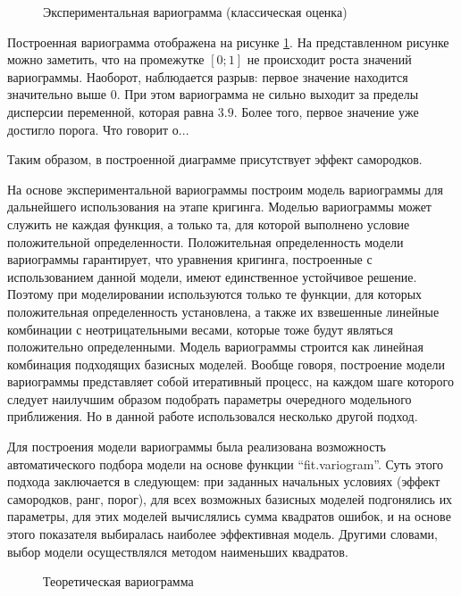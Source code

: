 \begin{figure}[ht]
\caption{Экспериментальная вариограмма (классическая оценка)}
\label{img:variog1_emp}
\end{figure}

Построенная вариограмма отображена на рисунке \ref{img:variog1_emp}. На представленном рисунке можно заметить, что на промежутке $[0;1]$ не происходит роста значений вариограммы. Наоборот, наблюдается разрыв: первое значение находится значительно выше $0$. При этом вариограмма не сильно выходит за пределы дисперсии переменной, которая равна $3.9$. Более того, первое значение уже достигло порога. Что говорит о...

Таким образом, в построенной диаграмме присутствует эффект самородков.

На основе экспериментальной вариограммы построим модель вариограммы для дальнейшего использования на этапе кригинга. Моделью вариограммы может служить не каждая функция, а только та, для которой выполнено условие положительной определенности. Положительная определенность модели вариограммы гарантирует, что уравнения кригинга, построенные с использованием данной модели, имеют единственное устойчивое решение. Поэтому при моделировании используются только те функции, для которых положительная определенность установлена, а также их взвешенные линейные комбинации с неотрицательными весами, которые тоже будут являться положительно определенными. Модель вариограммы строится как линейная комбинация подходящих базисных моделей. Вообще говоря, построение модели вариограммы представляет собой итеративный процесс, на каждом шаге которого следует наилучшим образом подобрать параметры очередного модельного приближения. Но в данной работе использовался несколько другой подход.

Для построения модели вариограммы была реализована возможность автоматического подбора модели на основе функции ``fit.variogram''. Суть этого подхода заключается в следующем: при заданных начальных условиях (эффект самородков, ранг, порог), для всех возможных базисных моделей подгонялись их параметры, для этих моделей вычислялись сумма квадратов ошибок, и на основе этого показателя выбиралась наиболее эффективная модель. Другими словами, выбор модели осуществлялся методом наименьших квадратов.

\begin{figure}[ht]
\caption{Теоретическая вариограмма}
\label{img:variog1_mod}
\end{figure}


